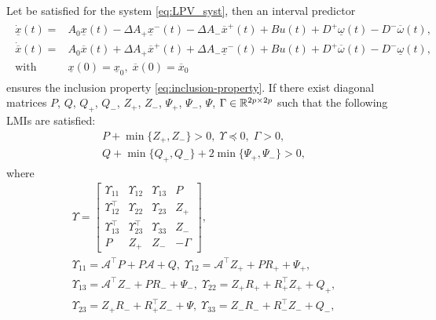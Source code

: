 \begin{theorem}
	\label{thm:interval-predictor-main}
	\begin{leftbar}[theorembar]
	Let  be satisfied for the system \eqref{eq:LPV_syst}, then an interval predictor
	\begin{align}
	\label{eq:interval-predictor}
	\begin{split}
	\dot{\underline{x}}(t) = {} & A_{0}\underline{x}(t)-\Delta A_{+}\underline{x}^{-}(t)-\Delta A_{-}\overline{x}^{+}(t) +Bu(t) +D^{+}\underline{\omega}(t)-D^{-}\overline{\omega}(t),\\
	\dot{\overline{x}}(t) = {} & A_{0}\overline{x}(t)+\Delta A_{+}\overline{x}^{+}(t)+\Delta A_{-}\underline{x}^{-}(t)  +Bu(t) +D^{+}\overline{\omega}(t)-D^{-}\underline{\omega}(t), \\
	\text{with }\, & \underline{x}(0)=\underline{x}_{0},\;\overline{x}(0)=\overline{x}_{0} 
	\end{split}
	\end{align}
	ensures the inclusion property \eqref{eq:inclusion-property}. 
	If there exist diagonal matrices $P$, $Q$, $Q_{+}$, $Q_{-}$, $Z_{+}$, $Z_{-}$, $\Psi_{+}$, $\Psi_{-}$, $\Psi$, $\Gamma\in\mathbb{R}^{2p\times2p}$ such that the following LMIs are satisfied:
	\begin{gather*}
	P+\min\{Z_{+},Z_{-}\}>0,\;\Upsilon\preceq0,\;\Gamma>0,\\
	Q+\min\{Q_{+},Q_{-}\}+2\min\{\Psi_{+},\Psi_{-}\}>0,
	\end{gather*}
	where{
		\begin{gather*}
		\Upsilon=\left[\begin{array}{cccc}
		\Upsilon_{11} & \Upsilon_{12} & \Upsilon_{13} & P\\
		\Upsilon_{12}^{\top} & \Upsilon_{22} & \Upsilon_{23} & Z_{+}\\
		\Upsilon_{13}^{\top} & \Upsilon_{23}^{\top} & \Upsilon_{33} & Z_{-}\\
		P & Z_{+} & Z_{-} & -\Gamma
		\end{array}\right],\\
		\Upsilon_{11}=\mathcal{A}^{\top}P+P\mathcal{A}+Q,\;\Upsilon_{12}=\mathcal{A}^{\top}Z_{+}+PR_{+}+\Psi_{+},\\
		\Upsilon_{13}=\mathcal{A}^{\top}Z_{-}+PR_{-}+\Psi_{-},\;\Upsilon_{22}=Z_{+}R_{+}+R_{+}^{\top}Z_{+}+Q_{+},\\
		\Upsilon_{23}=Z_{+}R_{-}+R_{+}^{\top}Z_{-}+\Psi,\;\Upsilon_{33}=Z_{-}R_{-}+R_{-}^{\top}Z_{-}+Q_{-},\\

\end{gather*}}
\end{leftbar}
\end{theorem}
